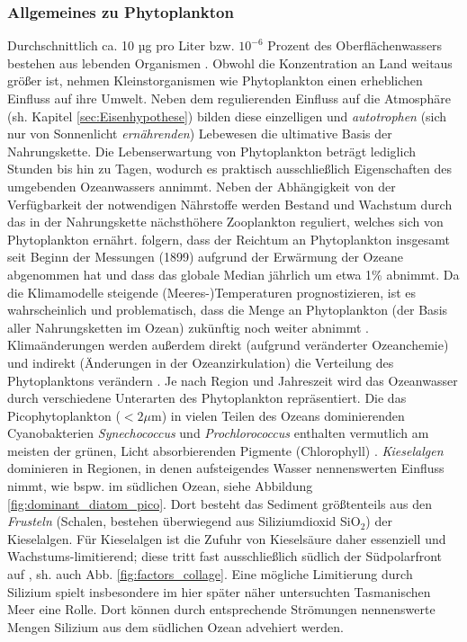 \documentclass[12pt,a4paper,onecolumn,headheight=30pt]{scrartcl}
\begin{document}
\subsubsection{Allgemeines zu Phytoplankton} \label{sec:Phytobasics}
Durchschnittlich  ca. 10 µg pro Liter bzw. $10^{-6}$ Prozent des Oberflächenwassers bestehen aus lebenden Organismen \citep{Emerson.2009}. Obwohl die Konzentration an Land weitaus größer ist, nehmen Kleinstorganismen wie Phytoplankton einen erheblichen Einfluss auf ihre Umwelt. Neben dem regulierenden Einfluss auf die Atmosphäre (sh. Kapitel \ref{sec:Eisenhypothese}) bilden diese einzelligen und \textit{autotrophen} (sich nur von Sonnenlicht \textit{ernährenden}) Lebewesen die ultimative Basis der Nahrungskette. Die Lebenserwartung von Phytoplankton beträgt lediglich Stunden bis hin zu Tagen, wodurch es praktisch ausschließlich Eigenschaften des umgebenden Ozeanwassers annimmt. Neben der Abhängigkeit von der Verfügbarkeit der notwendigen Nährstoffe werden Bestand und Wachstum durch das in der Nahrungskette nächsthöhere Zooplankton reguliert, welches sich von Phytoplankton ernährt. \citet{Boyce.2010} folgern, dass der Reichtum an Phytoplankton insgesamt seit Beginn der Messungen (1899) aufgrund der Erwärmung der Ozeane abgenommen hat und dass das globale Median jährlich um etwa 1\% abnimmt. Da die Klimamodelle steigende (Meeres-)Temperaturen prognostizieren, ist es wahrscheinlich und problematisch, dass die Menge an Phytoplankton (der Basis aller Nahrungsketten im Ozean) zukünftig noch weiter abnimmt \citep{Siegel.2010}. Klimaänderungen werden außerdem direkt (aufgrund veränderter Ozeanchemie) und indirekt (Änderungen in der Ozeanzirkulation) die Verteilung des Phytoplanktons verändern \citep{Falkowski.1998}. Je nach Region und Jahreszeit wird das Ozeanwasser durch verschiedene Unterarten des Phytoplankton repräsentiert. Die das Picophytoplankton ($<2\mu$m) in vielen Teilen des Ozeans dominierenden Cyanobakterien \textit{Synechococcus} und \textit{Prochlorococcus} enthalten vermutlich am meisten der grünen, Licht absorbierenden Pigmente (Chlorophyll) \citep{Emerson.2009}. \textit{Kieselalgen} dominieren in Regionen, in denen aufsteigendes Wasser nennenswerten Einfluss nimmt, wie bspw. im südlichen Ozean, siehe Abbildung \ref{fig:dominant_diatom_pico}. Dort besteht das Sediment größtenteils aus den \textit{Frusteln} (Schalen, bestehen überwiegend aus Siliziumdioxid SiO$_2$) der Kieselalgen. Für Kieselalgen ist die Zufuhr von Kieselsäure daher essenziell und Wachstums-limitierend; diese tritt fast ausschließlich südlich der Südpolarfront auf \citep{Falkowski.1998}, sh. auch Abb. \ref{fig:factors_collage}. Eine mögliche Limitierung durch Silizium spielt insbesondere im  hier später näher untersuchten Tasmanischen Meer eine Rolle. Dort können durch entsprechende Strömungen nennenswerte Mengen Silizium aus dem südlichen Ozean advehiert werden.
\end{document}
